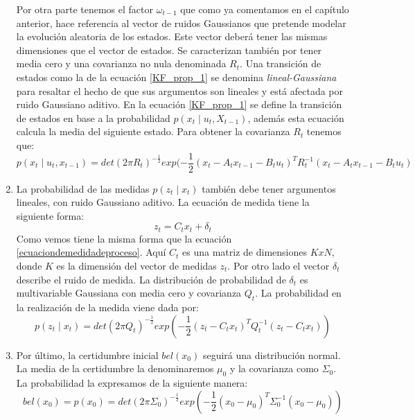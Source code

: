 \begin{enumerate}
     Por otra parte tenemos el factor $\omega_{t-1}$ que como ya comentamos en el capítulo anterior, hace referencia al vector de ruidos Gaussianos que pretende modelar la evolución aleatoria de los estados.
     Este vector deberá tener las mismas dimensiones que el vector de estados.
     Se caracterizan también por tener media cero y  una covarianza no nula denominada $R_{t}$.
     Una transición de estados como la de la ecuación \ref{KF_prop_1} se denomina \textit{lineal-Gaussiana} para resaltar el hecho de que sus argumentos son lineales y está afectada por ruido Gaussiano aditivo. 
     En la ecuación \ref{KF_prop_1} se define la transición de estados en base a la probabilidad $p(x_{t} \mid u_{t},X_{t-1})$, además esta ecuación calcula la media del siguiente estado. 
     Para obtener la covarianza $R_{t}$ tenemos que:
     \begin{equation}\label{Ec:Calcula_Rt}
p(x_{t} \mid u_{t},x_{t-1}) = det(2\pi R_{t})^{-\frac{1}{2}}exp(-\frac{1}{2}(x_{t}-A_{t}x_{t-1}-B_{t}u_{t})^{T}R_{t}^{-1}(x_{t}-A_{t}x_{t-1}-B_{t}u_{t})
	\end{equation} 
     
     \item La probabilidad de las medidas $p(z_{t} \mid x_{t} )$ también debe tener argumentos lineales, con ruido Gaussiano aditivo.
     La ecuación de medida tiene la siguiente forma:
    \begin{equation}\label{Ec:medida}
	z_{t} = C_{t}x_{t}+ \delta_{t}
	\end{equation} 
    Como vemos tiene la misma forma que la ecuación \ref{ecuaciondemedidadeproceso}.
    Aquí $C_t$ es una matriz de dimensiones $KxN$, donde $K$ es la dimensión del vector de medidas $z_{t}$.
    Por otro lado el vector $\delta_{t}$ describe el ruido de medida.
    La distribución de probabilidad de $\delta_{t}$ es multivariable Gaussiana con media cero y covarianza $Q_{t}$.
    La probabilidad en la realización de la medida viene dada por: 
     \begin{equation}\label{Ec:prob_medida}
	p(z_{t} \mid x_{t}) = det(2\pi Q_{t})^{-\frac{1}{2}}exp(-\frac{1}{2}(z_{t}-C_{t}x_{t})^{T}Q_{t}^{-1}(z_{t}-C_{t}x_{t}))
	\end{equation}
    \item Por último, la certidumbre inicial $bel(x_{0})$ seguirá una distribución normal.
%
%
%
    La media de la certidumbre la denominaremos $\mu_0$ y la covarianza como $\Sigma_{0}$.
    La probabilidad la expresamos de la siguiente manera:
     \begin{equation}\label{Ec:prob_certidumbre}
	bel(x_{0})= p(x_{0}) = det(2\pi \Sigma_{0})^{-\frac{1}{2}}exp(-\frac{1}{2}(x_{0}-\mu_{0})^{T}\Sigma_{0}^{-1}(x_{0}-\mu_{0}))
	\end{equation}
\end{enumerate}
